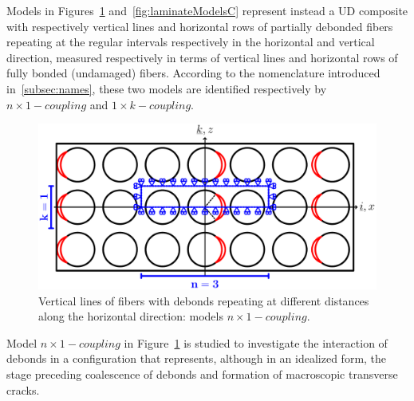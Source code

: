 \documentclass[review]{elsarticle}
\begin{document}
Models in Figures~\ref{fig:laminateModelsB} and~\ref{fig:laminateModelsC} represent instead a UD composite with respectively vertical lines and horizontal rows of partially debonded fibers repeating at the regular intervals respectively in the horizontal and vertical direction, measured respectively in terms of vertical lines and horizontal rows of fully bonded (undamaged) fibers. According to the nomenclature introduced in~\ref{subsec:names}, these two models are identified respectively by $n\times 1-coupling$ and $1\times k-coupling$.

\begin{figure}[!h]
\centering
\includegraphics[width=\textwidth]{verticalLinesOfDebonds.pdf}
\caption{Vertical lines of fibers with debonds repeating at different distances along the horizontal direction: models $n\times 1-coupling$.}\label{fig:laminateModelsB}
\end{figure}

Model $n\times 1-coupling$ in Figure~\ref{fig:laminateModelsB} is studied to investigate the interaction of debonds in a configuration that represents, although in an idealized form, the stage preceding coalescence of debonds and formation of macroscopic transverse cracks. 
\end{document}
